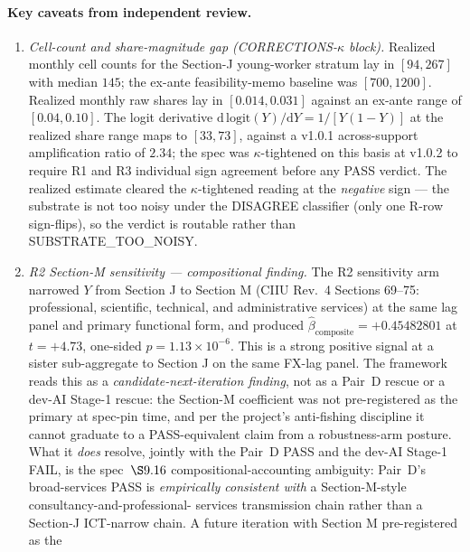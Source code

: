 \paragraph{Key caveats from independent review.}
\begin{enumerate}
  \item \emph{Cell-count and share-magnitude gap (CORRECTIONS-\(\kappa\)
    block).} Realized monthly cell counts for the Section-J young-worker
    stratum lay in \([94, 267]\) with median \(145\); the ex-ante
    feasibility-memo baseline was \([700, 1200]\). Realized monthly raw
    shares lay in \([0.014, 0.031]\) against an ex-ante range of
    \([0.04, 0.10]\). The logit derivative
    \(\mathrm{d}\,\mathrm{logit}(Y)/\mathrm{d}Y = 1/[Y(1-Y)]\) at the
    realized share range maps to \([33, 73]\), against a v1.0.1
    across-support amplification ratio of \(2.34\); the spec was
    \(\kappa\)-tightened on this basis at v1.0.2 to require R1 and R3
    individual sign agreement before any PASS verdict. The realized
    estimate cleared the \(\kappa\)-tightened reading at the
    \emph{negative} sign --- the substrate is not too noisy under the
    DISAGREE classifier (only one R-row sign-flips), so the verdict is
    routable rather than SUBSTRATE\_TOO\_NOISY.
  \item \emph{R2 Section-M sensitivity --- compositional finding.}
    The R2 sensitivity arm narrowed \(Y\) from Section J to Section M
    (CIIU Rev.~4 Sections 69--75: professional, scientific, technical,
    and administrative services) at the same lag panel and primary
    functional form, and produced
    \(\hat{\beta}_{\mathrm{composite}} = +0.45482801\) at
    \(t = +4.73\), one-sided \(p = 1.13 \times 10^{-6}\). This is
    a strong positive signal at a sister sub-aggregate to Section J
    on the same FX-lag panel. The framework reads this as a
    \emph{candidate-next-iteration finding}, not as a Pair~D rescue or
    a dev-AI Stage-1 rescue: the Section-M coefficient was not
    pre-registered as the primary at spec-pin time, and per the
    project's anti-fishing discipline it cannot graduate to a
    PASS-equivalent claim from a robustness-arm posture. What it
    \emph{does} resolve, jointly with the Pair~D PASS and the dev-AI
    Stage-1 FAIL, is the spec~\(\S 9.16\) compositional-accounting
    ambiguity: Pair~D's broad-services PASS is \emph{empirically
    consistent with} a Section-M-style consultancy-and-professional-
    services transmission chain rather than a Section-J ICT-narrow
    chain. A future iteration with Section M pre-registered as the

\end{enumerate}
